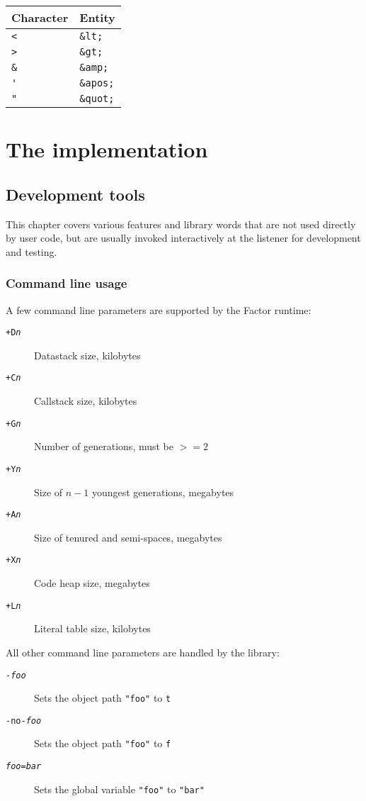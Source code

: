 \documentclass{book}
\begin{document}
\begin{tabular}{l|l}
Character&Entity\\
\hline
\verb|<|   &\verb|&lt;|\\
\verb|>|   &\verb|&gt;|\\
\verb|&|   &\verb|&amp;|\\
\verb|'|   &\verb|&apos;|\\
\verb|"|   &\verb|&quot;|
\end{tabular}

\part{The implementation}

\chapter{Development tools}

This chapter covers various features and library words that are not used directly by user code, but are usually invoked interactively at the listener for development and testing.

\section{Command line usage}

A few command line parameters are supported by the Factor runtime:
\begin{description}
\item[\texttt{+D\emph{n}}] Datastack size, kilobytes
\item[\texttt{+C\emph{n}}] Callstack size, kilobytes
\item[\texttt{+G\emph{n}}] Number of generations, must be $>= 2$
\item[\texttt{+Y\emph{n}}] Size of $n-1$ youngest generations, megabytes
\item[\texttt{+A\emph{n}}] Size of tenured and semi-spaces, megabytes
\item[\texttt{+X\emph{n}}] Code heap size, megabytes
\item[\texttt{+L\emph{n}}] Literal table size, kilobytes
\end{description}

All other command line parameters are handled by the library:
\begin{description}
\item[\texttt{-\emph{foo}}] Sets the object path \verb|"foo"| to \verb|t|
\item[\texttt{-no-\emph{foo}}] Sets the object path \verb|"foo"| to \verb|f|
\item[\texttt{\emph{foo}=\emph{bar}}] Sets the global variable \verb|"foo"| to \verb|"bar"|
\end{description}
\end{document}
